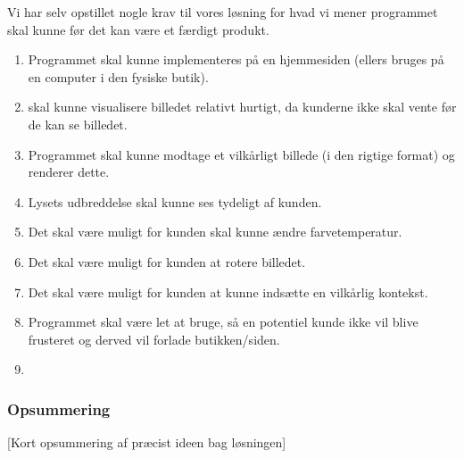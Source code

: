 Vi har selv opstillet nogle krav til vores løsning for hvad vi mener programmet skal kunne før det kan være et færdigt produkt.
\begin{enumerate}
    \item Programmet skal kunne implementeres på en hjemmesiden (ellers bruges på en computer i den fysiske butik).
    \item skal kunne visualisere billedet relativt hurtigt, da kunderne ikke skal vente før de kan se billedet.
    \item Programmet skal kunne modtage et vilkårligt billede (i den rigtige format) og renderer dette.
    \item Lysets udbreddelse skal kunne ses tydeligt af kunden.
    \item Det skal være muligt for kunden skal kunne ændre farvetemperatur.
    \item Det skal være muligt for kunden at rotere billedet.
    \item Det skal være muligt for kunden at kunne indsætte en vilkårlig kontekst.
    \item Programmet skal være let at bruge, så en potentiel kunde ikke vil blive frusteret og derved vil forlade butikken/siden.
    \item 
\end{enumerate}

\subsubsection*{Opsummering}
[Kort opsummering af præcist ideen bag løsningen]